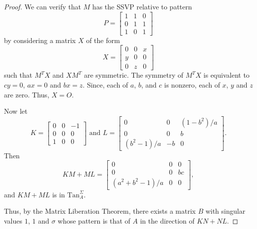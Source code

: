 \documentclass[10pt,a4paper]{amsart}
\begin{document}
\begin{proof}
We can verify that $M$ has the SSVP relative to 
pattern 
\[
P=\left[ \begin{array}{ccc}
1 & 1& 0 \\
0 & 1 & 1 \\
1 & 0 & 1
\end{array} 
\right] 
\]
 by considering a matrix $X$ of the 
form
\[ 
X= \left[ \begin{array}{ccc} 0 & 0 & x \\ y & 0 & 0 \\ 0 & z & 0 
\end{array} \right] 
\]
such that $M^TX$ and $XM^T$ are symmetric.
The symmetry of $M^TX$ is equivalent to $cy=0$, $ax=0$ and $bx=z$.
Since, each of $a$, $b$, and $c$ is nonzero, each of $x$, $y$ and $z$ are zero.  Thus, $X=O$.

Now let 
\[
K= 
\left[ \begin{array}{rrr}
0 & 0 & -1 \\
0 & 0 & 0 \\
1 & 0 & 0 \end{array} 
\right] 
\mbox{ and } L= \left[ \begin{array}{ccc} 
0 & 0 & (1-b^2)/a 
\\
0 & 0 & b \\
(b^2-1)/a & -b & 0 
\end{array} \right].
\]
Then 
\[ 
KM+ML= \left[ 
\begin{array}{ccc}
0 & 0 & 0 \\
0 & 0 & bc\\
(a^2 + b^2 -1)/a & 
0 & 0 
\end{array} 
\right],
\]
and $KM+ML$ is in $\mbox{Tan}^{\Sigma}_A$.


Thus, by the Matrix Liberation Theorem,
there exists a matrix $B$ with singular values $1$, $1$ and $\sigma$ whose pattern is that of $A$ in the direction of $KN+NL$. 
\end{proof}
\end{document}
